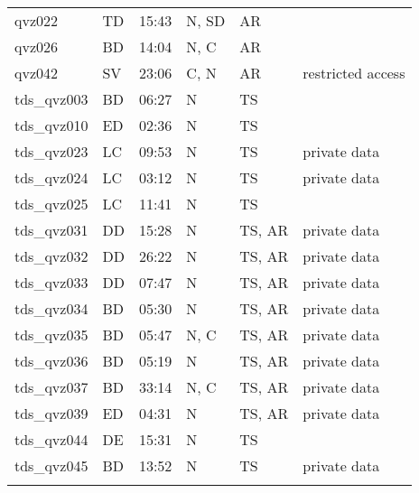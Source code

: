 \documentclass[output=paper]{langscibook}
\begin{document}
{\begin{tabular}{llllll}
qvz022      & TD & 15:43 & N, SD & AR & \citet{Ricea}\\
qvz026      & BD & 14:04 & N, C  & AR & \citet{Ricea}\\
qvz042      & SV & 23:06 & C, N  & AR & restricted access\\
tds\_qvz003 & BD & 06:27 & N & TS & \citep{Swanson2020}\\
tds\_qvz010 & ED & 02:36 & N & TS & \citep{Swanson2021a}\\
tds\_qvz023 & LC & 09:53 & N & TS & private data\\
tds\_qvz024 & LC & 03:12 & N & TS & private data\\
tds\_qvz025 & LC & 11:41 & N & TS & \citep{Swanson2017}\\
tds\_qvz031 & DD & 15:28 & N & TS, AR & private data\\
tds\_qvz032 & DD & 26:22 & N & TS, AR & private data\\
tds\_qvz033 & DD & 07:47 & N & TS, AR & private data\\
tds\_qvz034 & BD & 05:30 & N & TS, AR & private data\\
tds\_qvz035 & BD & 05:47 & N, C &  TS, AR  & private data\\
tds\_qvz036 & BD & 05:19 & N    &  TS, AR  & private data\\
tds\_qvz037 & BD & 33:14 & N, C &  TS, AR  & private data\\
tds\_qvz039 & ED & 04:31 & N    &  TS, AR  & private data\\
tds\_qvz044 & DE & 15:31 & N & TS & \citep{Swanson2021a}\\
tds\_qvz045 & BD & 13:52 & N & TS & private data\\
\lspbottomrule
\end{tabular}}
\end{document}
